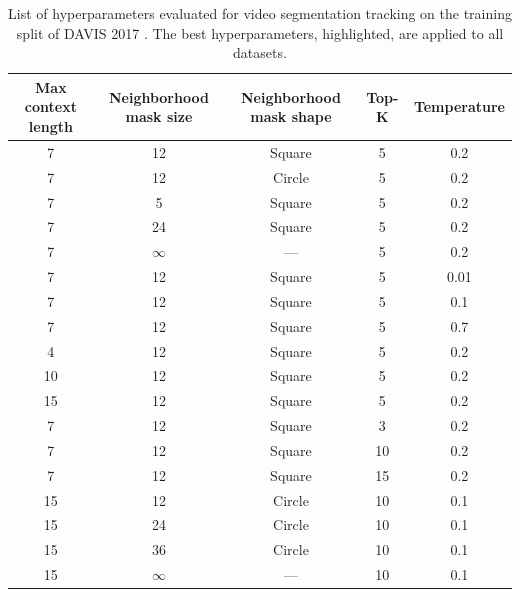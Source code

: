 \begin{table}[tb]
    \centering
    \caption{
        List of hyperparameters evaluated for video segmentation tracking on the training split of DAVIS 2017 \citep{pont20172017}.
        The best hyperparameters, highlighted, are applied to all datasets.
    }
    \label{tab:exp-details-tracking-hyperparameters}
    \begin{tabular}{@{}ccccc@{}}
        \toprule
        Max context length & Neighborhood mask size & Neighborhood mask shape & Top-K & Temperature \\
        \midrule
        \phantom{0}7 & 12 & Square & \phantom{0}5 & 0.2\phantom{0} \\
        \phantom{0}7 & 12 & Circle & \phantom{0}5 & 0.2\phantom{0} \\
        \phantom{0}7 & \phantom{0}5 & Square & \phantom{0}5 & 0.2\phantom{0} \\
        \phantom{0}7 & 24 & Square & \phantom{0}5 & 0.2\phantom{0} \\
        \rowcolor{lightgray} \phantom{0}7 & \(\infty\) & --- & \phantom{0}5 & 0.2\phantom{0} \\
        \phantom{0}7 & 12 & Square & \phantom{0}5 & 0.01  \\
        \phantom{0}7 & 12 & Square & \phantom{0}5 & 0.1\phantom{0}  \\
        \phantom{0}7 & 12 & Square & \phantom{0}5 & 0.7\phantom{0}  \\
        \phantom{0}4 & 12 & Square & \phantom{0}5 & 0.2\phantom{0}  \\
        10 & 12 & Square & \phantom{0}5 & 0.2\phantom{0}  \\
        15 & 12 & Square & \phantom{0}5 & 0.2\phantom{0}  \\
        \phantom{0}7 & 12 & Square & \phantom{0}3 & 0.2\phantom{0}  \\
        \phantom{0}7 & 12 & Square & 10 & 0.2\phantom{0}  \\
        \phantom{0}7 & 12 & Square & 15 & 0.2\phantom{0}  \\
        15 & 12 & Circle & 10 & 0.1\phantom{0} \\
        15 & 24 & Circle & 10 & 0.1\phantom{0} \\
        15 & 36 & Circle & 10 & 0.1\phantom{0} \\
        15 & \(\infty\) & --- & 10 & 0.1\phantom{0} \\
        \bottomrule
    \end{tabular}
\end{table}

